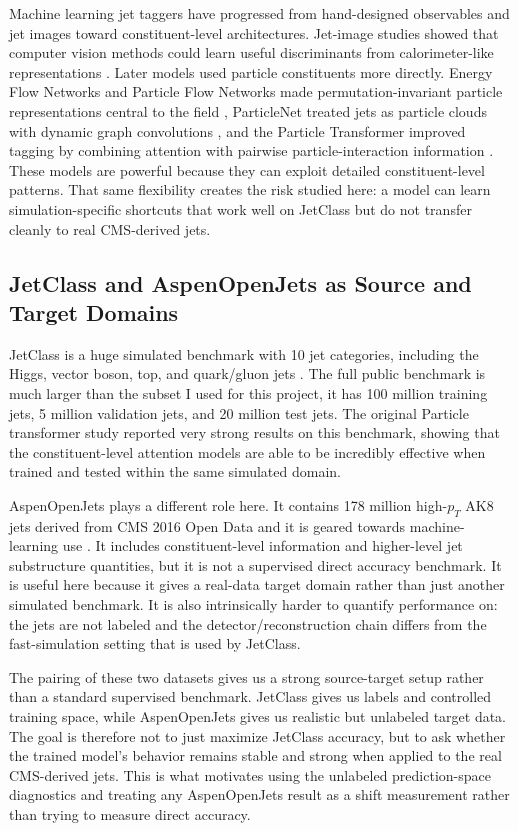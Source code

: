 \documentclass[11pt]{article}
\begin{document}
Machine learning jet taggers have progressed from hand-designed observables and jet images toward constituent-level architectures. Jet-image studies showed that computer vision methods could learn useful discriminants from calorimeter-like representations \cite{cogan2015jetimages,deoliveira2016jetimages}. Later models used particle constituents more directly. Energy Flow Networks and Particle Flow Networks made permutation-invariant particle representations central to the field \cite{komiske2019energy}, ParticleNet treated jets as particle clouds with dynamic graph convolutions \cite{qu2020particlenet}, and the Particle Transformer improved tagging by combining attention with pairwise particle-interaction information \cite{qu2022particle}. These models are powerful because they can exploit detailed constituent-level patterns. That same flexibility creates the risk studied here: a model can learn simulation-specific shortcuts that work well on JetClass but do not transfer cleanly to real CMS-derived jets.


\subsection{JetClass and AspenOpenJets as Source and Target Domains}

JetClass is a huge simulated benchmark with 10 jet categories, including the Higgs, vector boson, top, and quark/gluon jets \cite{qu2022particle}. The full public benchmark is much larger than the subset I used for this project, it has 100 million training jets, 5 million validation jets, and 20 million test jets. The original Particle transformer study reported very strong results on this benchmark, showing that the constituent-level attention models are able to be incredibly effective when trained and tested within the same simulated domain.

AspenOpenJets plays a different role here. It contains 178 million  high-$p_T$ AK8 jets derived from CMS 2016 Open Data and it is geared towards machine-learning use \cite{amram2025aspen}. It includes constituent-level information and higher-level jet substructure quantities, but it is not a supervised direct accuracy benchmark. It is useful here because it gives a real-data target domain rather than just another simulated benchmark. It is also intrinsically harder to quantify performance on: the jets are not labeled and the detector/reconstruction chain differs from the fast-simulation setting that is used by JetClass.

The pairing of these two datasets gives us a strong source-target setup rather than a standard supervised benchmark. JetClass gives us labels and controlled training space, while AspenOpenJets gives us realistic but unlabeled target data. The goal is therefore not to just maximize JetClass accuracy, but to ask whether the trained model’s behavior remains stable and strong when applied to the real CMS-derived jets. This is what motivates using the unlabeled prediction-space diagnostics and treating any AspenOpenJets result as a shift measurement rather than trying to measure direct accuracy. 
\end{document}

